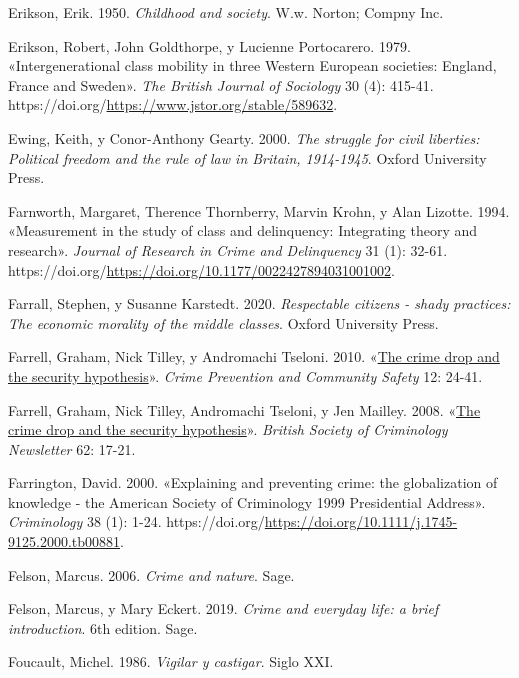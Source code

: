 \documentclass[
  spanish,
  letterpaper,
  DIV=11,
  numbers=noendperiod]{scrreprt}
\newlength{\cslhangindent}
\newenvironment{CSLReferences}[2] %
 {\begin{list}{}{%
  \setlength{\itemindent}{0pt}
  \setlength{\leftmargin}{0pt}
  \setlength{\parsep}{0pt}
  \ifodd #1
   \setlength{\leftmargin}{\cslhangindent}
   \setlength{\itemindent}{-1\cslhangindent}
  \fi
  \setlength{\itemsep}{#2\baselineskip}}}
 {\end{list}}
\begin{document}
\begin{CSLReferences}{1}{0}
Erikson, Erik. 1950. \emph{Childhood and society}. W.w. Norton; Compny
Inc.

Erikson, Robert, John Goldthorpe, y Lucienne Portocarero. 1979.
{«Intergenerational class mobility in three Western European societies:
England, France and Sweden»}. \emph{The British Journal of Sociology} 30
(4): 415-41. https://doi.org/\url{https://www.jstor.org/stable/589632}.

Ewing, Keith, y Conor-Anthony Gearty. 2000. \emph{The struggle for civil
liberties: Political freedom and the rule of law in Britain, 1914-1945}.
Oxford University Press.

Farnworth, Margaret, Therence Thornberry, Marvin Krohn, y Alan Lizotte.
1994. {«Measurement in the study of class and delinquency: Integrating
theory and research»}. \emph{Journal of Research in Crime and
Delinquency} 31 (1): 32-61.
https://doi.org/\url{https://doi.org/10.1177/0022427894031001002}.

Farrall, Stephen, y Susanne Karstedt. 2020. \emph{Respectable citizens -
shady practices: The economic morality of the middle classes}. Oxford
University Press.

Farrell, Graham, Nick Tilley, y Andromachi Tseloni. 2010. {«\href{}{The
crime drop and the security hypothesis}»}. \emph{Crime Prevention and
Community Safety} 12: 24-41.

Farrell, Graham, Nick Tilley, Andromachi Tseloni, y Jen Mailley. 2008.
{«\href{}{The crime drop and the security hypothesis}»}. \emph{British
Society of Criminology Newsletter} 62: 17-21.

Farrington, David. 2000. {«Explaining and preventing crime: the
globalization of knowledge - the American Society of Criminology 1999
Presidential Address»}. \emph{Criminology} 38 (1): 1-24.
https://doi.org/\url{https://doi.org/10.1111/j.1745-9125.2000.tb00881}.

Felson, Marcus. 2006. \emph{Crime and nature}. Sage.

Felson, Marcus, y Mary Eckert. 2019. \emph{Crime and everyday life: a
brief introduction}. 6th edition. Sage.

Foucault, Michel. 1986. \emph{Vigilar y castigar}. Siglo XXI.


\end{CSLReferences}
\end{document}
